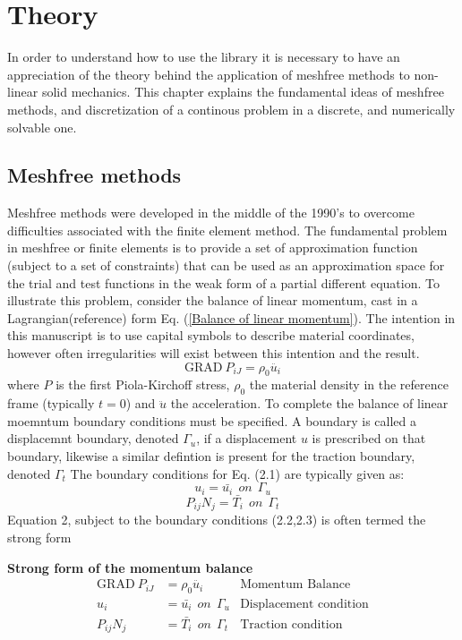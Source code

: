 \chapter{Theory}		
In order to understand how to use the library it is necessary to have an appreciation of the theory behind the application of meshfree methods to non-linear solid mechanics. This chapter explains the fundamental ideas of meshfree methods, and discretization of a continous problem in a discrete, and numerically solvable one. 
\section{Meshfree methods}
Meshfree methods were developed in the middle of the 1990's to overcome difficulties associated with the finite element method. The fundamental problem in meshfree or finite elements is to provide a set of approximation function (subject to a set of constraints) that can be used as an approximation space for the trial and test functions in the weak form of a partial different equation.  To illustrate this problem, consider the balance of linear momentum, cast in a Lagrangian(reference) form Eq. (\ref{Balance of linear momentum}). The intention in this manuscript is to use capital symbols to describe material coordinates, however often irregularities will exist between this intention and the result. 
\begin{equation}\label{Balance of linear momentum}
\text{GRAD} ~ P_{iJ} = \rho_0 \ddot{u_i}
\end{equation}
where $P$ is the first Piola-Kirchoff stress, $\rho_0$ the material density in the reference frame (typically $t=0$) and $\ddot{u}$ the acceleration. To complete the balance of linear moemntum boundary conditions must be specified. A boundary is called a displacemnt boundary, denoted $\Gamma_u$, if a displacement $u$ is prescribed on that boundary, likewise a similar defintion is present for the traction boundary, denoted $\Gamma_t$ The boundary conditions for Eq. (2.1) are typically given as:
\begin{equation}
u_i=\bar{u_i} ~~on ~~\Gamma_u
\end{equation}
\begin{equation}
P_{ij}N_j = \bar{T_i} ~~on ~~\Gamma_t
\end{equation}
Equation 2, subject to the boundary conditions (2.2,2.3) is often termed the strong form 

	
\begin{tcolorbox}
\textbf{Strong form of the momentum balance}
\begin{align*}
\text{GRAD} ~ P_{iJ} &= \rho_0 \ddot{u_i} &\text{Momentum Balance} \\
u_i&=\bar{u_i} ~~on ~~\Gamma_u &\text{Displacement condition} \\
P_{ij}N_j &= \bar{T_i} ~~on ~~\Gamma_t &\text{Traction condition}
\end{align*}
\end{tcolorbox}

